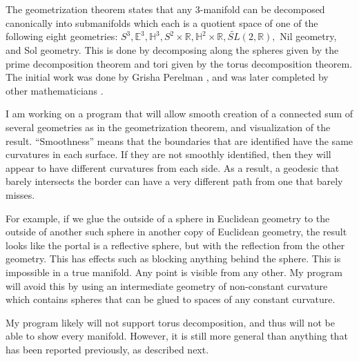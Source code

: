 

The geometrization theorem states that any 3-manifold can be decomposed canonically into submanifolds which each is a quotient space of one of the following eight geometries: $S^3, \mathbb{E}^3, \mathbb{H}^3, S^2 \times \mathbb{R}, \mathbb{H}^2 \times \mathbb{R}, \tilde{SL}(2,\mathbb{R}),$ Nil geometry, and Sol geometry. This is done by decomposing along the spheres given by the prime decomposition theorem and tori given by the torus decomposition theorem. The initial work was done by Grisha Perelman \cite{Perelman1} \cite{Perelman3} \cite{Perelman2}, and was later completed by other mathematicians \cite{Geometrization1} \cite{Geometrization2} \cite{Geometrization3}.


I am working on a program that will allow smooth creation of a connected sum of several geometries as in the geometrization theorem, and visualization of the result. ``Smoothness'' means that the boundaries that are identified have the same curvatures in each surface. If they are not smoothly identified, then they will appear to have different curvatures from each side. As a result, a geodesic that barely intersects the border can have a very different path from one that barely misses.

For example, if we glue the outside of a sphere in Euclidean geometry to the outside of another such sphere in another copy of Euclidean geometry, the result looks like the portal is a reflective sphere, but with the reflection from the other geometry. This has effects such as blocking anything behind the sphere. This is impossible in a true manifold. Any point is visible from any other. My program will avoid this by using an intermediate geometry of non-constant curvature which contains spheres that can be glued to spaces of any constant curvature.

My program likely will not support torus decomposition, and thus will not be able to show every manifold. However, it is still more general than anything that has been reported previously, as described next.


